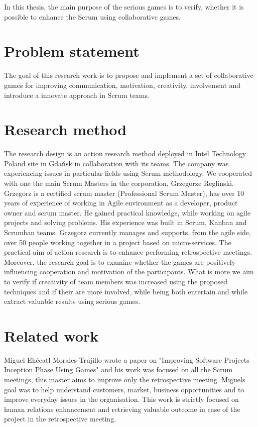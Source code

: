 In this thesis, the main purpose of the serious games is to verify, whether it is possible to enhance the Scrum using collaborative games.

\section{Problem statement}

The goal of this research work is to propose and implement a set of collaborative games for improving communication, motivation, creativity, involvement and introduce a innovate approach in Scrum teams.

\section{Research method}

The research design is an action research method deployed in Intel Technology Poland site in Gdańsk in collaboration with its teams. The company was experiencing issues in particular fields using Scrum methodology. We cooperated with one the main Scrum Masters in the corporation, Grzegorze Reglinski. Grzegorz is a certified scrum master (Professional Scrum Master), has over 10 years of experience of working in Agile environment as a developer, product owner and scrum master. He gained practical knowledge, while working on agile projects and solving problems. His experience was built in Scrum, Kanban and Scrumban teams. Grzegorz currently manages and supports, from the agile side, over 50 people working together in a project based on micro-services. The practical aim of action research is to enhance performing retrospective meetings. Moreover, the research goal is to examine whether the games are positively influencing cooperation and motivation of the participants. What is more we aim to verify if creativity of team members was increased using the proposed techniques and if their are more involved, while being both entertain and while extract valuable results using serious games.

\section{Related work}

Miguel Ehécatl Morales-Trujillo wrote a paper on "Improving Software Projects Inception Phase Using Games" and his work was focused on all the Scrum meetings, this master aims to improve only the retrospective meeting. Miguels goal was to help understand customers, market, business opportunities and to improve everyday issues in the organisation. This work is strictly focused on human relations enhancement and retrieving valuable outcome in case of the project in the retrospective meeting.

